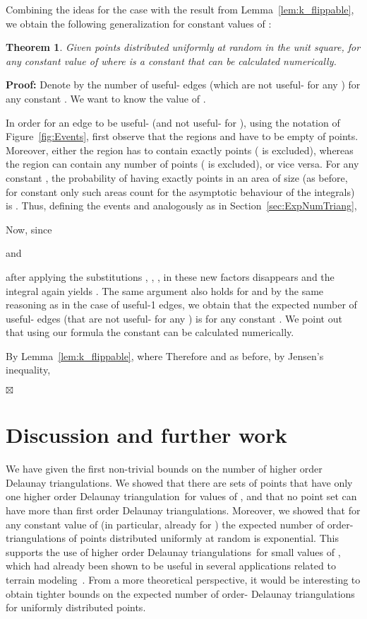 \documentclass {journal}
\newtheorem {theorem} {Theorem}
\newenvironment {proof}{\textbf {Proof:}}{\hfill \ensuremath {\boxtimes}}
\newcommand {\hodt}{higher order Delaunay triangulation}
\newcommand {\hodts}{higher order Delaunay triangulations}
\newcommand {\fodts}{first order Delaunay triangulations}
\begin{document}
Combining the ideas for the case  with the result from
Lemma~\ref{lem:k_flippable}, we obtain the following
generalization for constant values of :

\begin{theorem}
Given  points distributed uniformly at random in the unit
square, for any constant value of   where  is a constant that can be calculated
numerically.
\end{theorem}
\begin{proof}
Denote by  the number of useful- edges (which are not
useful- for any ) for any constant . We want to know the value of .

In order for an edge  to be useful- (and not
useful- for ), using the notation of
Figure~\ref{fig:Events}, first observe that the regions  and
 have to be empty of points. Moreover, either the region  has to contain exactly  points ( is
excluded), whereas the region  can contain any
number of points  ( is excluded), or vice
versa. For any constant , the probability of having exactly 
points in an area  of size  (as before, for constant 
only such areas count for the asymptotic behaviour of the
integrals) is . Thus,
defining the events   and
 analogously as in Section~\ref{sec:ExpNumTriang},



Now, since

and

after applying the substitutions , , , in these new factors  disappears and the
integral again yields . The same argument also
holds for  and by the same reasoning as in
the case of useful-1 edges, we obtain that the expected number of
useful- edges (that are not useful- for any ) is  for any constant . We point out that using our formula the
constant  can be calculated numerically.

By Lemma~\ref{lem:k_flippable},  where
 Therefore  and as before, by Jensen's inequality,

\end{proof}


\section{Discussion and further work}
\label{sec:discussion} We have given the first non-trivial bounds
on the number of \hodts. We showed that there are sets of 
points that have only one \hodt\ for values of , and that no point set can have
more than  \fodts. Moreover, we showed that for any
constant value of  (in particular, already for ) the
expected number of order- triangulations of  points
distributed uniformly at random is exponential. This supports the
use of \hodts\ for small values of , which had already been
shown to be useful in several applications related to terrain
modeling~\cite{kkl-grtho-07}. From a more theoretical perspective,
it would be interesting to obtain tighter bounds on the expected number of
order- Delaunay triangulations for uniformly distributed points.
\end{document}

